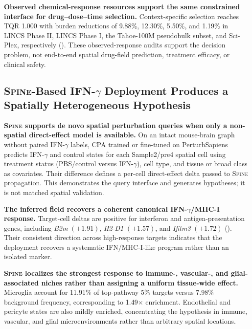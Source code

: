 \documentclass[sigconf,review,balance=false]{acmart}
\newcommand{\methodname}{\textsc{Spine}\xspace}
\begin{document}
\textbf{Observed chemical-response resources support the same constrained
interface for drug--dose--time selection.} Context-specific selection reaches
TQR 1.000 with burden reductions of 9.88\%, 12.30\%, 5.50\%, and 1.19\% in
LINCS Phase II, LINCS Phase I, the Tahoe-100M pseudobulk subset, and Sci-Plex,
respectively (). These observed-response audits
support the decision problem, not end-to-end spatial drug-field prediction,
treatment efficacy, or clinical safety.
\FloatBarrier








\subsection{\methodname{}-Based IFN-\texorpdfstring{$\gamma$}{gamma} Deployment Produces a Spatially Heterogeneous Hypothesis}
\label{sec:ifng_case_study}
\textbf{\methodname{} supports de novo spatial perturbation queries when only a
non-spatial direct-effect model is available.} On an intact mouse-brain graph
without paired IFN-$\gamma$ labels, CPA trained or fine-tuned on PerturbSapiens
predicts IFN-$\gamma$ and control states for each Sample2/pre4 spatial cell
using treatment status (PBS/control versus IFN-$\gamma$), cell type, and tissue
or broad class as covariates. Their difference defines a per-cell direct-effect
delta passed to \methodname{} propagation. This demonstrates the query
interface and generates hypotheses; it is not matched spatial validation.

\textbf{The inferred field recovers a coherent canonical
IFN-$\gamma$/MHC-I response.} Target-cell deltas are positive for interferon
and antigen-presentation genes, including \textit{B2m} $(+1.91)$,
\textit{H2-D1} $(+1.57)$, and \textit{Ifitm3} $(+1.72)$
(). Their consistent direction across
high-response targets indicates that the deployment recovers a systematic
IFN/MHC-I-like program rather than an isolated marker.

\textbf{\methodname{} localizes the strongest response to immune-, vascular-,
and glial-associated niches rather than assigning a uniform tissue-wide
effect.} Microglia account for 11.91\% of top-pathway 5\% targets versus
7.98\% background frequency, corresponding to 1.49$\times$ enrichment.
Endothelial and pericyte states are also mildly enriched, concentrating the
hypothesis in immune, vascular, and glial microenvironments rather than
arbitrary spatial locations.
\end{document}
